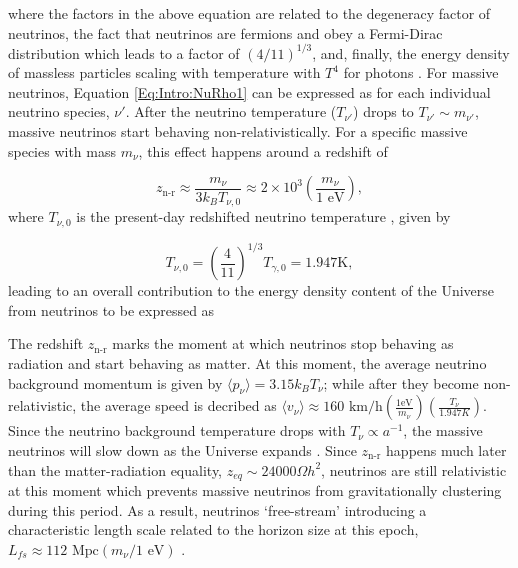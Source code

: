 where the factors in the above equation are related to the degeneracy factor of neutrinos, the fact that neutrinos are fermions and obey a Fermi-Dirac distribution which leads to a factor of $(4/11)^{1/3}$, and, finally, the energy density of massless particles scaling with temperature with $T^{4}$ for photons \citep[][p. 45]{dods}. For massive neutrinos, Equation \eqref{Eq:Intro:NuRho1} can be expressed as 
for each individual neutrino species, $\nu'$. After the neutrino temperature ($T_{\nu'}$) drops to $T_{\nu'} \sim  m_{\nu'}$, massive neutrinos start behaving non-relativistically. For a specific massive species with mass $m_{\nu}$, this effect happens around a redshift of

\begin{equation}
    z_{\text{n-r}} \approx \frac{m_{\nu}}{3k_B T_{\nu,0}} \approx 2\times 10^3 \left(\frac{m_{\nu}}{1 \text{ eV}} \right),
\end{equation}
where $T_{\nu,0}$ is the present-day redshifted neutrino temperature \citep{2000-NeutrinosDarkMatter}, given by

\begin{equation}
    T_{\nu,0} = \left( \frac{4}{11}\right)^{1/3}T_{\gamma,0} = 1.947 \text{K},
\end{equation}
leading to an overall contribution to the energy density content of the Universe from neutrinos to be expressed as \citep{2003HannestadNeutrino}


\qquad The redshift $z_{\text{n-r}}$ marks the moment at which neutrinos stop behaving as radiation and start behaving as matter. At this moment, the average neutrino background momentum is given by $\langle p_{\nu}\rangle = 3.15k_BT_{\nu}$; while after they become non-relativistic, the average speed is decribed as $\langle v_{\nu}\rangle \approx 160 \text{ km/h} \left( \frac{1 \text{eV}}{m_{\nu}}\right) \left( \frac{T_{\nu}}{1.947K}\right)$. Since the neutrino background temperature drops with $T_{\nu}\propto a^{-1}$, the massive neutrinos will slow down as the Universe expands \citep{2000-NeutrinosDarkMatter}. Since $z_{\text{n-r}}$ happens much later than the matter-radiation equality, $z_{eq}\sim 24000\Omega h^2$, neutrinos are still relativistic at this moment which prevents massive neutrinos from gravitationally clustering during this period. As a result, neutrinos `free-stream' introducing a characteristic length scale related to the horizon size at this epoch, $L_{fs} \approx 112 \text{ Mpc}\left( m_{\nu}/1 \text{ eV}\right)$ \citep{2000-NeutrinosDarkMatter,2003HannestadNeutrino,2017Lancaster-NeutrinosFreeStream}.

